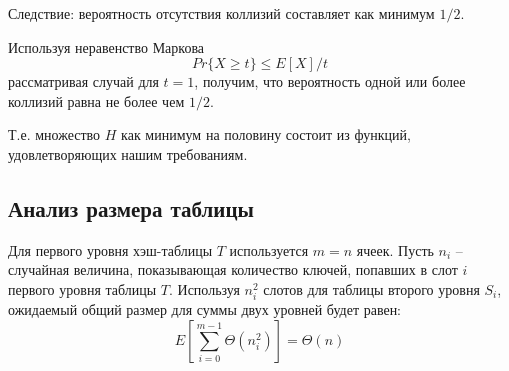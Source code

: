 \documentclass[11pt]{article}
\begin{document}
Следствие: вероятность отсутствия коллизий составляет как минимум $1/2$.

Используя неравенство Маркова
\begin{equation*}
  Pr\{X \geqslant t\} \leqslant E[X]/t  
\end{equation*}
рассматривая случай для $t =1$, получим, что вероятность одной или более коллизий равна не более чем $1/2$.

Т.е. множество $H$ как минимум на половину состоит из функций, удовлетворяющих нашим требованиям.

\subsection{Анализ размера таблицы}

Для первого уровня хэш-таблицы $T$ используется $m=n$ ячеек. Пусть $n_i$ -- случайная величина, показывающая количество ключей, попавших в слот $i$ первого уровня таблицы $T$. Используя $n_i^2$ слотов для таблицы второго уровня $S_i$, ожидаемый общий размер для суммы двух уровней будет равен:
\begin{equation*}
  E\left[\sum_{i=0}^{m-1}\Theta(n_i^2)\right] = \Theta(n)
\end{equation*}
\end{document}
